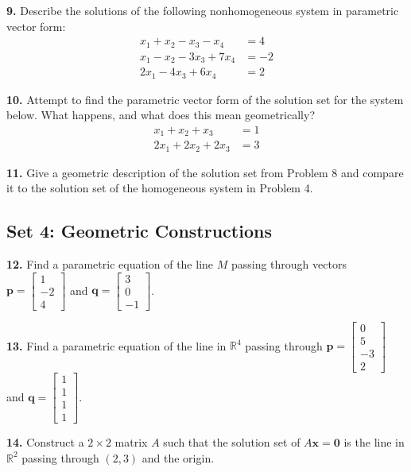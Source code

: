 \documentclass[12pt]{article}
\begin{document}
\textbf{9.} Describe the solutions of the following nonhomogeneous system in parametric vector form:
\begin{align*}
    x_1 + x_2 - x_3 - x_4 &= 4 \\
    x_1 - x_2 - 3x_3 + 7x_4 &= -2 \\
    2x_1 - 4x_3 + 6x_4 &= 2
\end{align*}

\textbf{10.} Attempt to find the parametric vector form of the solution set for the system below. What happens, and what does this mean geometrically?
\begin{align*}
    x_1 + x_2 + x_3 &= 1 \\
    2x_1 + 2x_2 + 2x_3 &= 3
\end{align*}

\textbf{11.} Give a geometric description of the solution set from Problem 8 and compare it to the solution set of the homogeneous system in Problem 4. 

\subsection*{Set 4: Geometric Constructions}
\textbf{12.} Find a parametric equation of the line $M$ passing through vectors $\mathbf{p} = \begin{bmatrix} 1 \\ -2 \\ 4 \end{bmatrix}$ and $\mathbf{q} = \begin{bmatrix} 3 \\ 0 \\ -1 \end{bmatrix}$.

\textbf{13.} Find a parametric equation of the line in $\mathbb{R}^4$ passing through $\mathbf{p} = \begin{bmatrix} 0 \\ 5 \\ -3 \\ 2 \end{bmatrix}$ and $\mathbf{q} = \begin{bmatrix} 1 \\ 1 \\ 1 \\ 1 \end{bmatrix}$.

\textbf{14.} Construct a $2 \times 2$ matrix $A$ such that the solution set of $A\mathbf{x} = \mathbf{0}$ is the line in $\mathbb{R}^2$ passing through $(2, 3)$ and the origin.
\end{document}
